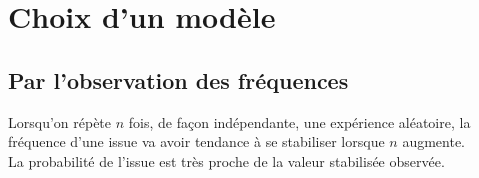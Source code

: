 \section{Choix d'un modèle}



\subsection{Par l'observation des fréquences}

\begin{definition}
Lorsqu'on répète $n$ fois, de façon indépendante, une expérience aléatoire,
la fréquence d'une issue va avoir tendance à se stabiliser lorsque $n$
augmente.\\
La probabilité de l'issue est très proche de la valeur stabilisée observée.
\end{definition}

